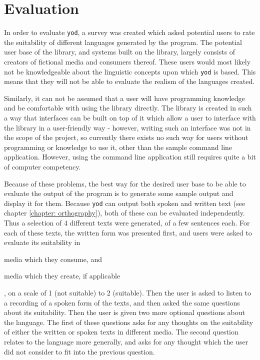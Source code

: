 \documentclass{report}
\begin{document}
	\chapter{Evaluation}
	\label{chapter: evaluation}
	
	In order to evaluate \texttt{yod}, a survey was created which asked potential users to rate the suitability of different languages generated by the program. The potential user base of the library, and systems built on the library, largely consists of creators of fictional media and consumers thereof. These users would most likely not be knowledgeable about the linguistic concepts upon which \texttt{yod} is based. This means that they will not be able to evaluate the realism of the languages created.
	
	Similarly, it can not be assumed that a user will have programming knowledge and be comfortable with using the library directly. The library is created in such a way that interfaces can be built on top of it which allow a user to interface with the library in a user-friendly way - however, writing such an interface was not in the scope of the project, so currently there exists no such way for users without programming or knowledge to use it, other than the sample command line application. However, using the command line application still requires quite a bit of computer competency.
	
	Because of these problems, the best way for the desired user base to be able to evaluate the output of the program is to generate some sample output and display it for them. Because \texttt{yod} can output both spoken and written text (see chapter \ref{chapter: orthography}), both of these can be evaluated independently. Thus a selection of 4 different texts were generated, of a few sentences each. For each of these texts, the written form was presented first, and users were asked to evaluate its suitability in \begin{enumerate*}[label=\alph*)]
		\item media which they consume, and
		\item media which they create, if applicable
	\end{enumerate*}, on a scale of 1 (not suitable) to 2 (suitable). Then the user is asked to listen to a recording of a spoken form of the texts, and then asked the same questions about its suitability. Then the user is given two more optional questions about the language. The first of these questions asks for any thoughts on the suitability of either the written or spoken texts in different media. The second question relates to the language more generally, and asks for any thought which the user did not consider to fit into the previous question.
\end{document}
